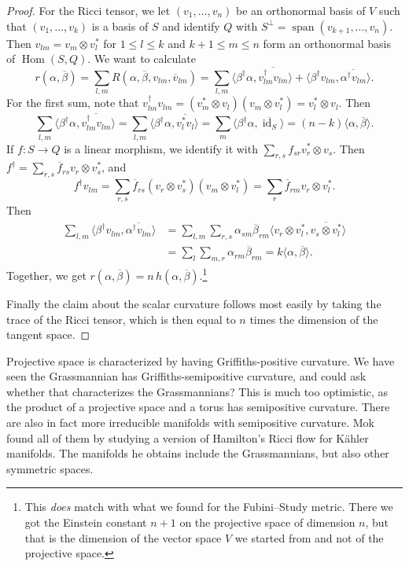 \documentclass[10pt,a4paper]{article}
\newtheorem*{proof}{Proof}
\def\ov#1{\overline{#1}}
\DeclareMathOperator{\Span}{span}
\DeclareMathOperator{\Hom}{Hom}
\DeclareMathOperator{\id}{id}
\begin{document}
\begin{proof}
For the Ricci tensor, we let $(v_1,\ldots,v_n)$ be an orthonormal basis of $V$ such that $(v_1,\ldots,v_k)$ is a basis of $S$ and identify $Q$ with $S^\perp = \Span(v_{k+1},\ldots,v_n)$.
Then $v_{lm} = v_m \otimes v_l^*$ for $1 \leq l \leq k$ and $k+1 \leq m \leq n$ form an orthonormal basis of $\Hom(S,Q)$.
We want to calculate
\[
r(\alpha,\ov\beta)
= \sum_{l,m} R(\alpha,\ov\beta,v_{lm}, \ov v_{lm})
= \sum_{l,m}
\langle \beta^\dagger \alpha, \ov{ v_{lm}^\dagger v_{lm}} \rangle
+ \langle \beta^\dagger v_{lm}, \ov{ \alpha^\dagger v_{lm} }\rangle.
\]
For the first sum, note that $v_{lm}^\dagger v_{lm} = (v_m^* \otimes v_l)(v_m \otimes v_l^*) = v_l^* \otimes v_l$. Then
\[
\sum_{l,m} \langle \beta^\dagger \alpha, \ov{ v_{lm}^\dagger v_{lm}} \rangle
= \sum_{l,m} \langle \beta^\dagger \alpha, \ov{ v_{l}^* v_{l}} \rangle
= \sum_{m} \langle \beta^\dagger \alpha, \ov{\id_S}\rangle
= (n-k) \langle \alpha, \ov \beta \rangle.
\]
If $f : S \to Q$ is a linear morphism, we identify it with $\sum_{r,s}
f_{sr} v_r^* \otimes v_s$. Then $f^\dagger = \sum_{r,s} \ov f_{rs}
v_r \otimes v_s^*$, and
\[
f^\dagger v_{lm}
= \sum_{r,s} \ov f_{rs} (v_r \otimes v_s^*)(v_m \otimes v_l^*)
= \sum_{r} \ov f_{rm} v_r \otimes v_l^*.
\]
Then
\begin{align*}
\sum_{l,m} \langle \beta^\dagger v_{lm}, \ov{ \alpha^\dagger v_{lm} }\rangle
&= \sum_{l,m} \sum_{r,s} \alpha_{sm} \ov \beta_{rm}
\langle v_r \otimes v_l^*, \ov{v_s \otimes v_l^*} \rangle
\\
&= \sum_{l} \sum_{m,r} \alpha_{rm} \ov \beta_{rm}
= k \langle \alpha, \ov\beta \rangle.
\end{align*}
Together, we get $r(\alpha,\ov\beta) = n \, h(\alpha, \ov\beta)$.\footnote{This \emph{does} match with what we found for the Fubini--Study metric. There we got the Einstein constant $n+1$ on the projective space of dimension $n$, but that is the dimension of the vector space $V$ we started from and not of the projective space.}

Finally the claim about the scalar curvature follows most easily by taking the trace of the Ricci tensor, which is then equal to $n$ times the dimension of the tangent space.
\end{proof}


Projective space is characterized by having Griffiths-positive
curvature. We have seen the Grassmannian has Griffiths-semipositive
curvature, and could ask whether that characterizes the Grassmannians?
This is much too optimistic, as the product of a projective space and
a torus has semipositive curvature. There are also in fact more
irreducible manifolds with semipositive curvature.
Mok~\cite{mok1988uniformization} found all of them by studying a version of Hamilton's Ricci flow for K\"ahler manifolds. The manifolds he obtains include the
Grassmannians, but also other symmetric spaces.
\end{document}
